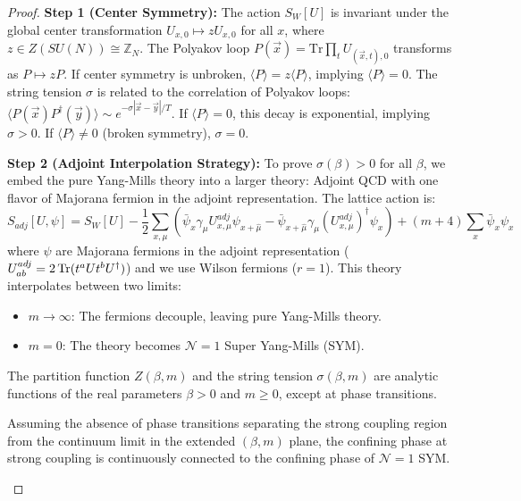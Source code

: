 \begin{proof}
\textbf{Step 1 (Center Symmetry):}
The action $S_W[U]$ is invariant under the global center transformation $U_{x,0} \mapsto z U_{x,0}$ for all $x$, where $z \in Z(SU(N)) \cong \mathbb{Z}_N$. The Polyakov loop $P(\vec{x}) = \mathrm{Tr}\prod_t U_{(\vec{x},t),0}$ transforms as $P \mapsto zP$.
If center symmetry is unbroken, $\langle P \rangle = z\langle P \rangle$, implying $\langle P \rangle = 0$.
The string tension $\sigma$ is related to the correlation of Polyakov loops: $\langle P(\vec{x}) P^\dagger(\vec{y}) \rangle \sim e^{-\sigma |\vec{x}-\vec{y}|/T}$. If $\langle P \rangle = 0$, this decay is exponential, implying $\sigma > 0$. If $\langle P \rangle \neq 0$ (broken symmetry), $\sigma = 0$.

\textbf{Step 2 (Adjoint Interpolation Strategy):}
To prove $\sigma(\beta) > 0$ for all $\beta$, we embed the pure Yang-Mills theory into a larger theory: Adjoint QCD with one flavor of Majorana fermion in the adjoint representation. The lattice action is:
\begin{equation}
S_{adj}[U, \psi] = S_W[U] - \frac{1}{2} \sum_{x, \mu} \left( \bar{\psi}_x \gamma_\mu U_{x,\mu}^{adj} \psi_{x+\hat{\mu}} - \bar{\psi}_{x+\hat{\mu}} \gamma_\mu (U_{x,\mu}^{adj})^\dagger \psi_x \right) + (m + 4) \sum_x \bar{\psi}_x \psi_x
\end{equation}
where $\psi$ are Majorana fermions in the adjoint representation ($U^{adj}_{ab} = 2\operatorname{Tr}(t^a U t^b U^\dagger)$) and we use Wilson fermions ($r=1$).
This theory interpolates between two limits:
\begin{itemize}
    \item $m \to \infty$: The fermions decouple, leaving pure Yang-Mills theory.
    \item $m = 0$: The theory becomes $\mathcal{N}=1$ Super Yang-Mills (SYM).
\end{itemize}
The partition function $Z(\beta, m)$ and the string tension $\sigma(\beta, m)$ are analytic functions of the real parameters $\beta > 0$ and $m \geq 0$, except at phase transitions.

\begin{proposition}
Assuming the absence of phase transitions separating the strong coupling region from the continuum limit in the extended $(\beta, m)$ plane, the confining phase at strong coupling is continuously connected to the confining phase of $\mathcal{N}=1$ SYM.
\end{proposition}


\end{proof}
